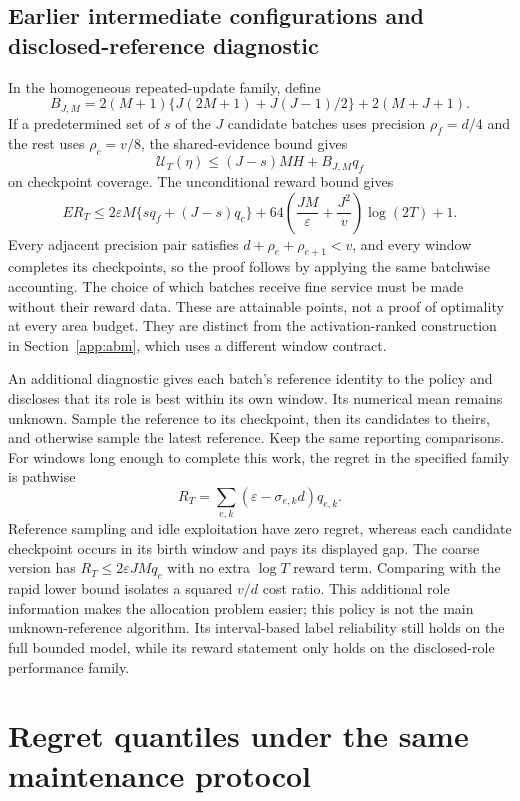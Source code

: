 \documentclass[11pt]{article}
\theoremstyle{remark}
\begin{document}
\subsection{Earlier intermediate configurations and disclosed-reference diagnostic}
\label{app:variants}

In the homogeneous repeated-update family, define
\[
 B_{J,M}=2(M+1)\{J(2M+1)+J(J-1)/2\}+2(M+J+1).
\]
If a predetermined set of $s$ of the $J$ candidate batches uses precision
$\rho_f=d/4$ and the rest uses $\rho_c=v/8$, the shared-evidence bound gives
\[
 \mathcal U_T(\eta)\le(J-s)MH+B_{J,M}q_f
\]
on checkpoint coverage. The unconditional reward bound gives
\[
 ER_T\le2\varepsilon M\{sq_f+(J-s)q_c\}
 +64\left(\frac{JM}{\varepsilon}+\frac{J^2}{v}\right)\log(2T)+1.
\]
Every adjacent precision pair satisfies
$d+\rho_e+\rho_{e+1}<v$, and every window completes its checkpoints, so
the proof follows by applying the same batchwise accounting. The choice of
which batches receive fine service must be made without their reward data.
These are attainable points, not a proof of optimality at every area budget.
They are distinct from the activation-ranked construction in
Section~\ref{app:abm}, which uses a different window contract.

An additional diagnostic gives each batch's reference identity to the policy
and discloses that its role is best within its own window. Its numerical mean
remains unknown. Sample the reference to its checkpoint, then its candidates
to theirs, and otherwise sample the latest reference. Keep the same reporting
comparisons. For windows long enough to complete this work, the regret in the
specified family is pathwise
\[
 R_T=\sum_{e,k}(\varepsilon-\sigma_{e,k}d)q_{e,k}.
\]
Reference sampling and idle exploitation have zero regret, whereas each
candidate checkpoint occurs in its birth window and pays its displayed gap.
The coarse version has $R_T\le2\varepsilon JM q_c$ with no extra $\log T$
reward term. Comparing with the rapid lower bound isolates a squared
$v/d$ cost ratio. This additional role information makes the allocation
problem easier; this policy is not the main unknown-reference algorithm.
Its interval-based label reliability still holds on the full bounded model,
while its reward statement only holds on the disclosed-role performance family.


\section{Regret quantiles under the same maintenance protocol}
\label{sec:quantile_extension}
\end{document}
